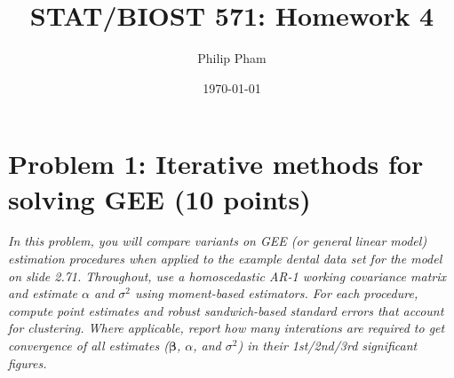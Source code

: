 \documentclass[11pt, letterpaper]{article}
\title{STAT/BIOST 571: Homework 4}
\author{Philip Pham}
\date{\today}
\newcommand{\bbeta}{{\bm \beta}}
\begin{document}
\maketitle

\section*{Problem 1: Iterative methods for solving GEE (10 points)} 

{\em In this problem, you will compare
variants on GEE (or general linear model) estimation procedures when applied to the example dental data set for the model on slide 2.71.
Throughout, use a homoscedastic AR-1 working covariance matrix and estimate $\alpha$ and $\sigma^2$
using moment-based estimators.
For each procedure, compute point estimates and robust sandwich-based standard errors that account for clustering.  Where applicable, report how many interations are required to get convergence of all estimates 
($\bbeta$, $\alpha$, and $\sigma^2$) in their 1st/2nd/3rd significant figures.}
\end{document}
